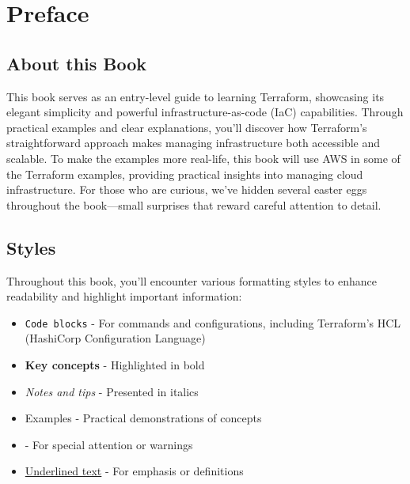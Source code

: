 \chapter*{Preface}

\section*{About this Book}

This book serves as an entry-level guide to learning Terraform, showcasing its elegant simplicity and powerful infrastructure-as-code (IaC) capabilities. Through practical examples and clear explanations, you'll discover how Terraform's straightforward approach makes managing infrastructure both accessible and scalable. To make the examples more real-life, this book will use AWS in some of the Terraform examples, providing practical insights into managing cloud infrastructure. For those who are curious, we've hidden several easter eggs throughout the book—small surprises that reward careful attention to detail.

\section*{Styles}

Throughout this book, you'll encounter various formatting styles to enhance readability and highlight important information:

\begin{itemize}[leftmargin=*,itemsep=0.1in] %
    \item \texttt{Code blocks} - For commands and configurations, including Terraform's HCL (HashiCorp Configuration Language)
    \item \textbf{Key concepts} - Highlighted in bold
    \item \textit{Notes and tips} - Presented in italics
    \item Examples - Practical demonstrations of concepts
    \item {} - For special attention or warnings
    \item \underline{Underlined text} - For emphasis or definitions
\end{itemize}

